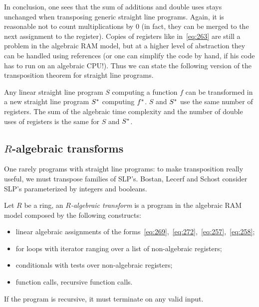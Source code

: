 In conclusion, one sees that the sum of additions and double uses
stays unchanged when transposing generic straight line
programs. Again, it is reasonable not to count multiplications by $0$
(in fact, they can be merged to the next assignment to the register).
Copies of registers like in~\eqref{eq:263} are still a problem in the
algebraic RAM model, but at a higher level of abstraction they can be
handled using references (or one can simplify the code by hand, if his
code has to run on an algebraic CPU!). Thus we can state the following
version of the transposition theorem for straight line programs.

\begin{theorem}
  \label{th:tellegen-slp}
  Any linear straight line program $S$ computing a function $f$ can be
  transformed in a new straight line program $S^\ast$ computing
  $f^\ast$.  $S$ and $S^\ast$ use the same number of
  registers. The sum of the algebraic time complexity and the number
  of double uses of registers is the same for $S$ and $S^\ast$.
\end{theorem}



\subsection{\texorpdfstring{$R$}{R}-algebraic transforms}
\label{sec:r-algebraic-transforms}
One rarely programs with straight line programs: to make transposition
really useful, we must transpose families of SLP's. Bostan, Lecerf and
Schost consider SLP's parameterized by integers and booleans.

\begin{definition}
  \label{def:algebraic-transform}
  Let $R$ be a ring, an \emph{$R$-algebraic
    transform} is a program in the algebraic RAM model composed by the
  following constructs:
  \begin{itemize}
  \item linear algebraic assignments of the
    forms~\eqref{eq:269},~\eqref{eq:272},~\eqref{eq:257},~\eqref{eq:258};
  \item for loops with iterator ranging over a list of non-algebraic
    registers;
  \item conditionals with tests over non-algebraic registers;
  \item function calls, recursive function calls.
  \end{itemize}
  If the program is recursive, it must terminate on any valid input.
\end{definition}

